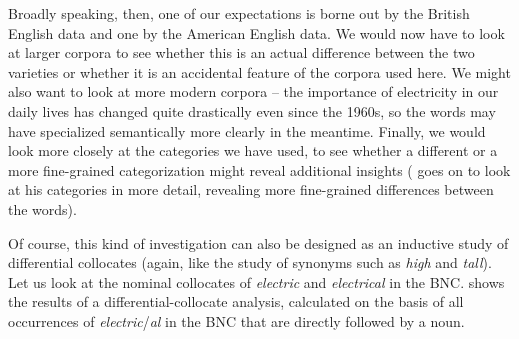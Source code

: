 Broadly speaking, then, one of our expectations is borne out by the British  English data and one by the American  English data. We would now have to look at larger  corpora to see whether this is an actual difference between the two varieties  or whether it is an accidental feature of the corpora used here. We might also want to look at more modern corpora -- the importance of electricity in our daily lives has changed quite drastically even since the 1960s, so the words may have specialized semantically  more clearly in the meantime. Finally, we would look more closely at the categories we have used, to see whether a different or a more fine\hyp{}grained categorization  might reveal additional insights (\citet{kaunisto_electric/electrical_1999} goes on to look at his categories in more detail, revealing more fine\hyp{}grained differences between the words).

Of course, this kind of investigation can also be designed  as an inductive  study of differential collocates (again, like the study of synonyms  such as \textit{high} and \textit{tall}). Let us look at the nominal  collocates  of \textit{electric} and \textit{electrical} in the BNC.   shows the results of a differential\hyp{}collocate analysis, calculated on the basis of all occurrences of \textit{electric}\slash \textit{al} in the BNC  that are directly followed by a noun.


